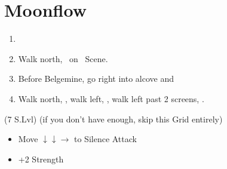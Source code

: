 \chapter{Moonflow}

\begin{enumerate}
    \item \formation{\tidus}{\kimahri}{\auron}
    \item Walk north, \sd\ on \kimahri\ Scene.
    \item Before Belgemine, go right into alcove and 
    \item Walk north, \sd, walk left, \sd, walk left past 2 screens, \sd.
\end{enumerate}
\begin{spheregrid}
    \begin{itemize}
        \wakkaf (7 S.Lvl) (if you don't have enough, skip this Grid entirely)
        \begin{itemize}
            \item Move $\downarrow\downarrow\rightarrow$ to Silence Attack
            \item +2 Strength
        \end{itemize}
    \end{itemize}
\end{spheregrid}
